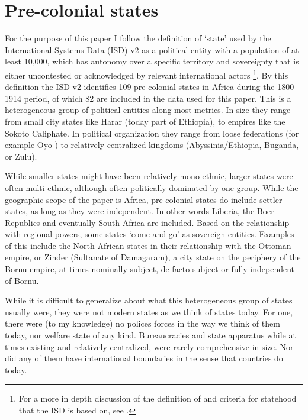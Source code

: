 \documentclass[12pt]{article}
\begin{document}

\section{Pre-colonial states}

For the purpose of this paper I follow the definition of `state' used by the
International Systems Data (ISD) v2 \citep{Butcher2020} as a political entity
with a population of at least 10,000, which has autonomy over a specific
territory and sovereignty that is either uncontested or acknowledged by relevant
international actors \citep{Butcher2020}\footnote{For a more in depth discussion
of the definition of and criteria for statehood that the ISD is based on, see
\citet{Butcher2017}.}. By this definition the ISD v2 identifies 109 pre-colonial
states in Africa during the 1800-1914 period, of which 82 are included in the
data used for this paper. This is a heterogeneous group of political entities
along most metrics. In size they range from small city states like Harar (today
part of Ethiopia), to empires like the Sokoto Caliphate. In political
organization they range from loose federations (for example Oyo \citep{Law1977})
to relatively centralized kingdoms (Abyssinia/Ethiopia, Buganda, or Zulu).

While smaller states might have been relatively mono-ethnic, larger states were
often multi-ethnic, although often politically dominated by one group. While the
geographic scope of the paper is Africa, pre-colonial states do include settler
states, as long as they were independent. In other words Liberia, the Boer
Republics and eventually South Africa are included. Based on the relationship
with regional powers, some states `come and go' as sovereign entities. Examples
of this include the North African states in their relationship with the Ottoman
empire, or Zinder (Sultanate of Damagaram), a city state on the periphery of the
Bornu empire, at times nominally subject, de facto subject or fully independent
of Bornu.

While it is difficult to generalize about what this heterogeneous group of
states usually were, they were not modern states as we think of states today.
For one, there were (to my knowledge) no polices forces in the way we think of
them today, nor welfare state of any kind. Bureaucracies and state apparatus
while at times existing and relatively centralized, were rarely comprehensive in
size. Nor did any of them have international boundaries in the sense that
countries do today. 
\end{document}
